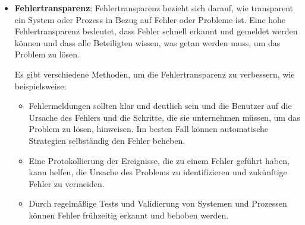 \begin{itemize}
\item \textbf{Fehlertransparenz}: Fehlertransparenz bezieht sich darauf, wie transparent ein System oder Prozess in Bezug auf Fehler oder Probleme ist. Eine hohe Fehlertransparenz bedeutet, dass Fehler schnell erkannt und gemeldet werden können und dass alle Beteiligten wissen, was getan werden muss, um das Problem zu lösen.

Es gibt verschiedene Methoden, um die Fehlertransparenz zu verbessern, wie beispielsweise:
\begin{itemize}
\item Fehlermeldungen sollten klar und deutlich sein und die Benutzer auf die Ursache des Fehlers und die Schritte, die sie unternehmen müssen, um das Problem zu lösen, hinweisen. Im besten Fall können automatische Strategien selbständig den Fehler beheben.

\item Eine Protokollierung der Ereignisse, die zu einem Fehler geführt haben, kann helfen, die Ursache des Problems zu identifizieren und zukünftige Fehler zu vermeiden.

\item Durch regelmäßige Tests und Validierung von Systemen und Prozessen können Fehler frühzeitig erkannt und behoben werden.


\end{itemize}
\end{itemize}
